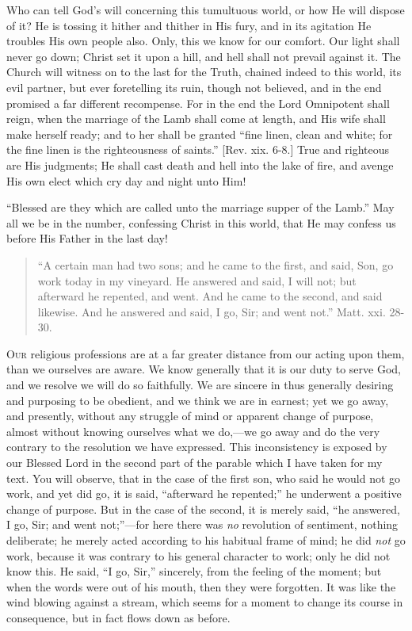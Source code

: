 Who can tell God's will concerning this tumultuous
world, or how He will dispose of it? He is tossing it
hither and thither in His fury, and in its agitation He troubles His own people also. Only, this we know for our
comfort. Our light shall never go down; Christ set it
upon a hill, and hell shall not prevail against it. The
Church will witness on to the last for the Truth, chained
indeed to this world, its evil partner, but ever
foretelling its ruin, though not believed, and in the end
promised a far different recompense. For in the end the
Lord Omnipotent shall reign, when the marriage of the
Lamb shall come at length, and His wife shall make
herself ready; and to her shall be granted ``fine
linen, clean and white; for the fine linen is the
righteousness of saints.'' [Rev. xix. 6-8.] True and
righteous are His judgments; He shall cast death and hell
into the lake of fire, and avenge His own elect which cry
day and night unto Him!

``Blessed are they which are called unto the
marriage supper of the Lamb.'' May all we be in the
number, confessing Christ in this world, that He may
confess us before His Father in the last day!


\begin{quote}

``A certain man had two sons; and he came to
the first, and said, Son, go work today in my
vineyard. He answered and said, I will not; but
afterward he repented, and went. And he came to the
second, and said likewise. And he answered and said,
I go, Sir; and went not.'' Matt. xxi. 28-30.

\end{quote}

O\textsc{ur} religious professions are at a far greater
distance from our acting upon them, than we ourselves are
aware. We know generally that it is our duty to serve
God, and we resolve we will do so faithfully. We are
sincere in thus generally desiring and purposing to be
obedient, and we think we are in earnest; yet we go away,
and presently, without any struggle of mind or apparent
change of purpose, almost without knowing ourselves what
we do,—we go away and do the very contrary to the
resolution we have expressed. This inconsistency is
exposed by our Blessed Lord in the second part of the
parable which I have taken for my text. You will observe,
that in the case of the first son, who said he would not
go work, and yet did go, it is said, ``afterward he
repented;'' he underwent a positive change of
purpose. But in the case of the second, it is merely
said, ``he answered, I go, Sir; and went
not;''—for here there was \emph{no} revolution
of sentiment, nothing deliberate; he merely acted
according to his habitual frame of mind; he did \emph{not}
go work, because it was contrary to his general character
to work; only he did not know this. He said, ``I go,
Sir,'' sincerely, from the feeling of the moment; but
when the words were out of his mouth, then they were
forgotten. It was like the wind blowing against a stream,
which seems for a moment to change its course in
consequence, but in fact flows down as before.

